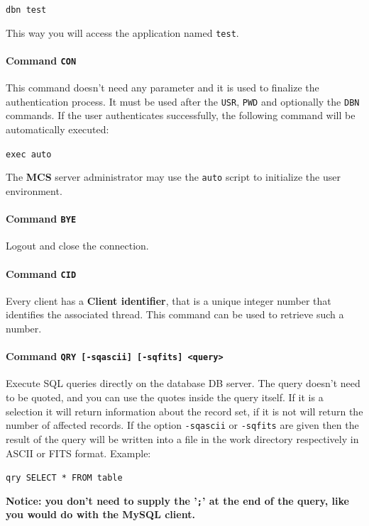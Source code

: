 \documentclass[12pt,titlepage]{article}
\newcommand{\mcs}{\textbf{MCS} }
\begin{document}
\bigskip
\verb|dbn test|
\bigskip

This way you will access the application named \verb|test|.

%
\paragraph{Command \texttt{CON}}
This command doesn't need any parameter and it is used to finalize the
authentication process. It must be used after the \verb|USR|,
\verb|PWD| and optionally the \verb|DBN| commands. If the user
authenticates successfully, the following command will be automatically
executed:

\bigskip
\verb|exec auto|
\bigskip

The \mcs server administrator may use the \verb|auto| script to
initialize the user environment.

%
\paragraph{Command \texttt{BYE}}
Logout and close the connection.

%
\paragraph{Command \texttt{CID}}
Every client has a \textbf{Client identifier}, that is a unique
integer number that identifies the associated thread. This command can
be used to retrieve such a number.

%
\paragraph{Command \texttt{QRY [-sqascii] [-sqfits] <query>}}
Execute SQL queries directly on the database DB server. The query
doesn't need to be quoted, and you can use the quotes inside the query
itself. If it is a selection it will return information about the
record set, if it is not will return the number of affected
records. If the option \verb|-sqascii| or \verb|-sqfits| are given
then the result of the query will be written into a file in the work
directory respectively in ASCII or FITS format. Example:

\bigskip
\verb|qry SELECT * FROM table|
\bigskip

\begin{framed}
\bfseries{Notice}: you don't need to supply the '\verb|;|' at the
end of the query, like you would do with the MySQL client.
\end{framed}
\end{document}
